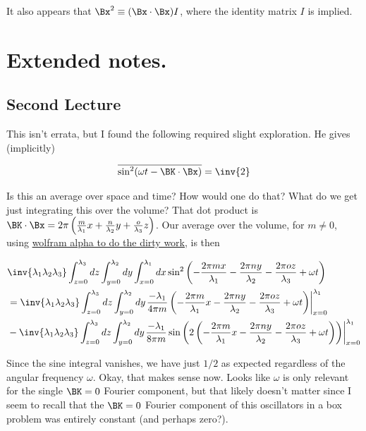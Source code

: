 It also appears that $\Bx^2 \equiv (\Bx \cdot \Bx) I$, where the identity matrix $I$ is implied.

\section{Extended notes.}

\subsection{Second Lecture}

This isn't errata, but I found the following required slight exploration.  He gives (implicitly)

\begin{align*}
\overline{\sin^2(\omega t - \BK \cdot \Bx)} = \inv{2}
\end{align*}

Is this an average over space and time?  How would one do that?  What do we get just integrating this over the volume?  That dot product is $\BK \cdot \Bx = 2 \pi \left(\frac{m}{\lambda_1} x + \frac{n}{\lambda_2} y + \frac{o}{\lambda_3} z \right)$.  Our average over the volume, for $m \ne 0$, using \href{http://www.wolframalpha.com/input/?i=\int+sin^2(a+x+%2B+b)+dx}{wolfram alpha to do the dirty work}, is then

\begin{align*}
&\inv{\lambda_1 \lambda_2 \lambda_3} 
\int_{z=0}^{\lambda_3} dz
\int_{y=0}^{\lambda_2} dy
\int_{x=0}^{\lambda_1}
dx \sin^2 \left( 
-\frac{2 \pi m x}{\lambda_1} 
-\frac{2 \pi n y}{\lambda_2} 
-\frac{2 \pi o z}{\lambda_3} 
+ \omega t \right) \\
&=
\inv{\lambda_1 \lambda_2 \lambda_3} 
\int_{z=0}^{\lambda_3} dz
\int_{y=0}^{\lambda_2} dy
{\left.
\frac{-\lambda_1}{4 \pi m} \left( 
-\frac{2 \pi m }{\lambda_1} x 
-\frac{2 \pi n y}{\lambda_2} 
-\frac{2 \pi o z}{\lambda_3} 
+ \omega t \right)
\right\vert}_{x=0}^{\lambda_1} \\
&-
\inv{\lambda_1 \lambda_2 \lambda_3} 
\int_{z=0}^{\lambda_3} dz
\int_{y=0}^{\lambda_2} dy
{\left.
\frac{-\lambda_1}{8 \pi m} 
\sin \left( 2 \left(
-\frac{2 \pi m }{\lambda_1} x 
-\frac{2 \pi n y}{\lambda_2} 
-\frac{2 \pi o z}{\lambda_3} 
+ \omega t \right) \right)
\right\vert}_{x=0}^{\lambda_1}
\end{align*}

Since the sine integral vanishes, we have just $1/2$ as expected regardless of the angular frequency $\omega$.  Okay, that makes sense now.  Looks like $\omega$ is only relevant for the single $\BK = 0$ Fourier component, but that likely doesn't matter since I seem to recall that the $\BK = 0$ Fourier component of this oscillators in a box problem was entirely constant (and perhaps zero?).


